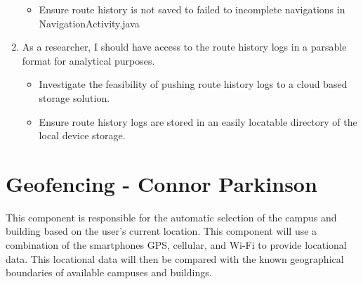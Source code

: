\documentclass{scrreprt}
\begin{document}
\begin{enumerate}
		\begin{itemize}
			\item Ensure route history is not saved to failed to incomplete navigations in NavigationActivity.java
		\end{itemize}
	
	\item As a researcher, I should have access to the route history logs in a parsable format for analytical purposes.
	
		\begin{itemize}
			\item Investigate the feasibility of pushing route history logs to a cloud based storage solution.
			\item Ensure route history logs are stored in an easily locatable directory of the local device storage.
		\end{itemize}
	
\end{enumerate}

\pagebreak

\section{Geofencing - Connor Parkinson}
This component is responsible for the automatic selection of the campus and building based on the user’s current location. This component will use a combination of the smartphones GPS, cellular, and Wi-Fi to provide locational data. This locational data will then be compared with the known geographical boundaries of available campuses and buildings.
\end{document}
